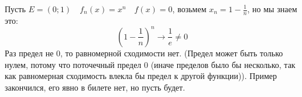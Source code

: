 \begin{example} \thmslashn

  Пусть $E = (0; 1)\quad f_n(x) = x^n\quad f(x) = 0$, возьмем $x_n = 1-\frac{1}{n}$, но мы знаем это:
  $$\left(1 - \frac{1}{n}\right)^n \rightarrow\frac{1}{e} \neq 0$$
  Раз предел не 0, то равномерной сходимости нет. (Предел может быть только нулем, потому что поточечный предел 0 (иначе пределов было бы несколько, так как равномерная сходимость влекла бы предел к другой функции)). Пример закончился, его явно в билете нет, но пусть будет.
\end{example}
